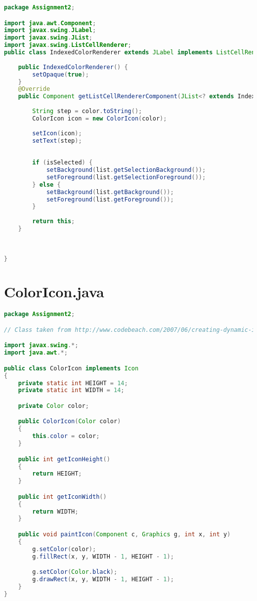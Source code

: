 \documentclass[pdftex,a4paper,10pt,titlepage]{article}
\begin{document}
\begin{lstlisting}[language=java, breaklines=true]
package Assignment2;

import java.awt.Component;
import javax.swing.JLabel;
import javax.swing.JList;
import javax.swing.ListCellRenderer;
public class IndexedColorRenderer extends JLabel implements ListCellRenderer<IndexedColor>  {
    
    public IndexedColorRenderer() {
        setOpaque(true);
    }
    @Override
    public Component getListCellRendererComponent(JList<? extends IndexedColor> list, IndexedColor color, int index, boolean isSelected, boolean cellHasFocus) {
        
        String step = color.toString();
        ColorIcon icon = new ColorIcon(color);
         
        setIcon(icon);
        setText(step);
        
        
        if (isSelected) {
            setBackground(list.getSelectionBackground());
            setForeground(list.getSelectionForeground());
        } else {
            setBackground(list.getBackground());
            setForeground(list.getForeground());
        }
         
        return this;
    }
    
     

}

\end{lstlisting}


\section{ColorIcon.java}

\begin{lstlisting}[language=java, breaklines=true]
package Assignment2;

// Class taken from http://www.codebeach.com/2007/06/creating-dynamic-icons-in-java.html

import javax.swing.*;
import java.awt.*;

public class ColorIcon implements Icon
{
    private static int HEIGHT = 14;
    private static int WIDTH = 14;

    private Color color;

    public ColorIcon(Color color)
    {
        this.color = color;
    }

    public int getIconHeight()
    {
        return HEIGHT;
    }

    public int getIconWidth()
    {
        return WIDTH;
    }

    public void paintIcon(Component c, Graphics g, int x, int y)
    {
        g.setColor(color);
        g.fillRect(x, y, WIDTH - 1, HEIGHT - 1);

        g.setColor(Color.black);
        g.drawRect(x, y, WIDTH - 1, HEIGHT - 1);
    }
}
\end{lstlisting}
\end{document}

